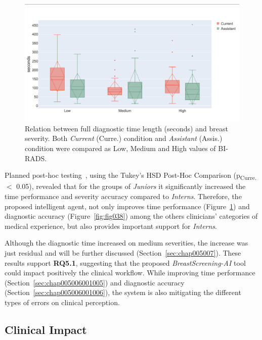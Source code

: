 \begin{figure}[ht]
\centering
\includegraphics[width=\columnwidth]{images/fig037}
\caption{Relation between full diagnostic time length (seconds) and breast severity. Both {\it Current} (Curre.) condition and {\it Assistant} (Assis.) condition were compared as Low, Medium and High values of BI-RADS.}
\label{fig:fig037}
\end{figure}

Planned post-hoc testing~\cite{10.1145/2858036.2858360}, using the Tukey's HSD Post-Hoc Comparison (p\textsubscript{Curre.} $<$ 0.05), revealed that for the groups of {\it Juniors} it significantly increased the time performance and severity accuracy compared to {\it Interns}.
Therefore, the proposed intelligent agent, not only improves time performance (Figure~\ref{fig:fig037}) and diagnostic accuracy (Figure~\ref{fig:fig038}) among the others clinicians' categories of medical experience, but also provides important support for {\it Interns}.

Although the diagnostic time increased on medium severities, the increase was just residual and will be further discussed (Section~\ref{sec:chap005007}).
These results support {\bf RQ5.1}, suggesting that the proposed {\it BreastScreening-AI} tool could impact positively the clinical workflow.
While improving time performance (Section~\ref{sec:chap005006001005}) and diagnostic accuracy (Section~\ref{sec:chap005006001006}), the system is also mitigating the different types of errors on clinical perception.

\subsection{Clinical Impact}
\label{sec:app002004001}

